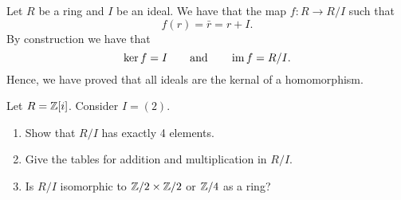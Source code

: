 \begin{example}
    Let $R$ be a ring and $I$ be an ideal.
    We have that the map $f: R \to R/I$ such that
    \[ f(r) = \bar r = r + I. \]
    By construction we have that
    \[ \ker f = I \qquad \text{and} \qquad \operatorname{im} f =  R/I. \]
    Hence, 
    we have proved that all ideals are the kernal of a homomorphism.
\end{example}

\begin{example}
    Let $R = \mathbb{Z}[i]$.
    Consider $I = (2)$.
    \begin{enumerate}
        \item Show that $R/I$ has exactly 4 elements.
        \item Give the tables for addition and multiplication in $R/I$.
        \item Is $R/I$ isomorphic to $\mathbb{Z}/2 \times \mathbb{Z}/2$ or $\mathbb{Z}/4$ as a ring?
    \end{enumerate}
\end{example}

